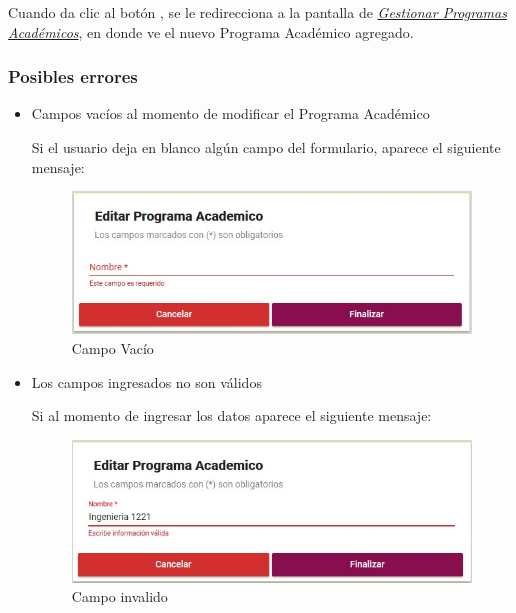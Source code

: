         Cuando da clic al botón , se le redirecciona a la pantalla de \hyperlink{consultarpa}{\textit{Gestionar Programas Académicos}}, en donde ve el nuevo Programa Académico agregado.\\


        \subsubsection{Posibles errores}

            \begin{itemize}
                \item Campos vacíos al momento de modificar el Programa Académico

                    Si el usuario deja en blanco algún campo del formulario, aparece el siguiente mensaje:

                    \begin{figure}[H]
                    \centering
                    \hypertarget{vacio}{\includegraphics[width=0.7\linewidth]{images/SP3/Vacio}}
                    \caption{Campo Vacío}
                    \label{vacio}
                    \end{figure}

                \item Los campos ingresados no son válidos

                    Si al momento de ingresar los datos aparece el siguiente mensaje:

                     \begin{figure}[H]
                    \centering
                    \hypertarget{invalido}{\includegraphics[width=0.7\linewidth]{images/SP3/Invalida}}
                    \caption{Campo invalido}
                    \label{invalido}
                    \end{figure}



\end{itemize}
